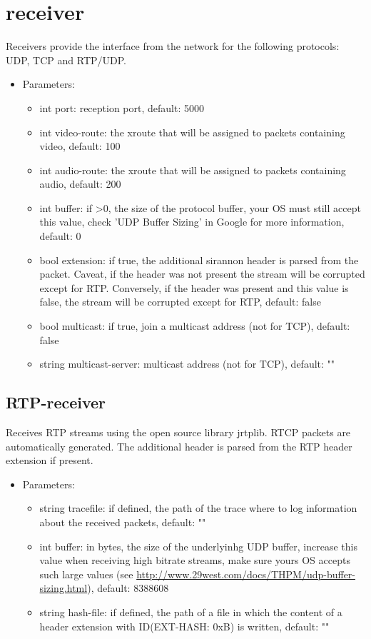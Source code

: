 \section{receiver}
Receivers provide the interface from the network for the following protocols: UDP, TCP and RTP/UDP.
\begin{itemize}
\item Parameters:
\begin{itemize}
\item int port: reception port, default: 5000
\item int video-route: the xroute that will be assigned to packets containing video, default: 100
\item int audio-route: the xroute that will be assigned to packets containing audio, default: 200
\item int buffer: if >0, the size of the protocol buffer, your OS must still accept this value, check 'UDP Buffer Sizing' in Google for more information, default: 0
\item bool extension: if true, the additional sirannon header is parsed from the packet. Caveat, if the header was not present the stream will be corrupted except for RTP. Conversely, if the header was present and this value is false, the stream will be corrupted except for RTP, default: false
\item bool multicast: if true, join a multicast address (not for TCP), default: false
\item string multicast-server: multicast address (not for TCP), default: ""
\end{itemize}
\end{itemize}
\subsection{RTP-receiver}
Receives RTP streams using the open source library jrtplib. RTCP packets are automatically generated. The additional header is parsed from the RTP header extension if present.
\begin{itemize}
\item Parameters:
\begin{itemize}
\item string tracefile: if defined, the path of the trace where to log information about the received packets, default: ""
\item int buffer: in bytes, the size of the underlyinhg UDP buffer, increase this value when receiving high bitrate streams, make sure yours OS accepts such large values (see \url{http://www.29west.com/docs/THPM/udp-buffer-sizing.html}), default: 8388608
\item string hash-file: if defined, the path of a file in which the content of a header extension with ID(EXT-HASH: 0xB) is written, default: ""
\end{itemize}
\end{itemize}
